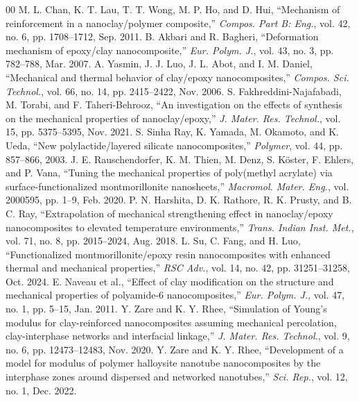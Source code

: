 \documentclass[conference]{IEEEtran}
\begin{document}
\begin{thebibliography}{00}
 M. L. Chan, K. T. Lau, T. T. Wong, M. P. Ho, and D. Hui, ``Mechanism of reinforcement in a nanoclay/polymer composite,'' \textit{Compos. Part B: Eng.}, vol. 42, no. 6, pp. 1708--1712, Sep. 2011.
 B. Akbari and R. Bagheri, ``Deformation mechanism of epoxy/clay nanocomposite,'' \textit{Eur. Polym. J.}, vol. 43, no. 3, pp. 782--788, Mar. 2007.
 A. Yasmin, J. J. Luo, J. L. Abot, and I. M. Daniel, ``Mechanical and thermal behavior of clay/epoxy nanocomposites,'' \textit{Compos. Sci. Technol.}, vol. 66, no. 14, pp. 2415--2422, Nov. 2006.
 S. Fakhreddini-Najafabadi, M. Torabi, and F. Taheri-Behrooz, ``An investigation on the effects of synthesis on the mechanical properties of nanoclay/epoxy,'' \textit{J. Mater. Res. Technol.}, vol. 15, pp. 5375--5395, Nov. 2021.
 S. Sinha Ray, K. Yamada, M. Okamoto, and K. Ueda, ``New polylactide/layered silicate nanocomposites,'' \textit{Polymer}, vol. 44, pp. 857--866, 2003.
 J. E. Rauschendorfer, K. M. Thien, M. Denz, S. K\"{o}ster, F. Ehlers, and P. Vana, ``Tuning the mechanical properties of poly(methyl acrylate) via surface-functionalized montmorillonite nanosheets,'' \textit{Macromol. Mater. Eng.}, vol. 2000595, pp. 1--9, Feb. 2020.
 P. N. Harshita, D. K. Rathore, R. K. Prusty, and B. C. Ray, ``Extrapolation of mechanical strengthening effect in nanoclay/epoxy nanocomposites to elevated temperature environments,'' \textit{Trans. Indian Inst. Met.}, vol. 71, no. 8, pp. 2015--2024, Aug. 2018.
 L. Su, C. Fang, and H. Luo, ``Functionalized montmorillonite/epoxy resin nanocomposites with enhanced thermal and mechanical properties,'' \textit{RSC Adv.}, vol. 14, no. 42, pp. 31251--31258, Oct. 2024.
 E. Naveau et al., ``Effect of clay modification on the structure and mechanical properties of polyamide-6 nanocomposites,'' \textit{Eur. Polym. J.}, vol. 47, no. 1, pp. 5--15, Jan. 2011.
 Y. Zare and K. Y. Rhee, ``Simulation of Young's modulus for clay-reinforced nanocomposites assuming mechanical percolation, clay-interphase networks and interfacial linkage,'' \textit{J. Mater. Res. Technol.}, vol. 9, no. 6, pp. 12473--12483, Nov. 2020.
 Y. Zare and K. Y. Rhee, ``Development of a model for modulus of polymer halloysite nanotube nanocomposites by the interphase zones around dispersed and networked nanotubes,'' \textit{Sci. Rep.}, vol. 12, no. 1, Dec. 2022.

\end{thebibliography}
\end{document}
